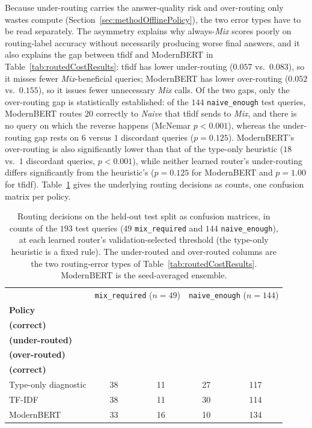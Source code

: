 \documentclass[english, bibtex]{kththesis}               %
\numberwithin{listing}{chapter}
\begin{document}
Because under-routing carries the answer-quality risk and over-routing only wastes compute (Section~\ref{sec:methodOfflinePolicy}), the two error types have to be read separately. The asymmetry explains why always-\emph{Mix} scores poorly on routing-label accuracy without necessarily producing worse final answers, and it also explains the gap between \gls{tfidf} and ModernBERT in Table~\ref{tab:routedCostResults}: \gls{tfidf} has lower under-routing ($0.057$ vs.\ $0.083$), so it misses fewer \emph{Mix}-beneficial queries; ModernBERT has lower over-routing ($0.052$ vs.\ $0.155$), so it issues fewer unnecessary \emph{Mix} calls. Of the two gaps, only the over-routing gap is statistically established: of the $144$ \texttt{naive\_enough} test queries, ModernBERT routes $20$ correctly to \emph{Naive} that \gls{tfidf} sends to \emph{Mix}, and there is no query on which the reverse happens (McNemar $p < 0.001$), whereas the under-routing gap rests on $6$ versus $1$ discordant queries ($p = 0.125$). ModernBERT's over-routing is also significantly lower than that of the type-only heuristic ($18$ vs.\ $1$ discordant queries, $p < 0.001$), while neither learned router's under-routing differs significantly from the heuristic's ($p = 0.125$ for ModernBERT and $p = 1.00$ for \gls{tfidf}). Table~\ref{tab:confusionMatrices} gives the underlying routing decisions as counts, one confusion matrix per policy.

\begin{table}[!ht]
\centering
\small
\setlength{\tabcolsep}{5pt}
\renewcommand{\arraystretch}{1.1}
\caption[Routing decisions on the held-out test split as confusion matrices]{Routing decisions on the held-out test split as confusion matrices, in counts of the $193$ test queries ($49$ \texttt{mix\_required} and $144$ \texttt{naive\_enough}), at each learned router's validation-selected threshold (the type-only heuristic is a fixed rule). The under-routed and over-routed columns are the two routing-error types of Table~\ref{tab:routedCostResults}. ModernBERT is the seed-averaged ensemble.}
\label{tab:confusionMatrices}
\begin{tabular}{l|cc|cc}
 & \multicolumn{2}{c|}{\texttt{mix\_required} ($n = 49$)} & \multicolumn{2}{c}{\texttt{naive\_enough} ($n = 144$)} \\
\textbf{Policy} & \makecell{\textbf{To \emph{Mix}}\\\textbf{(correct)}} & \makecell{\textbf{To \emph{Naive}}\\\textbf{(under-routed)}} & \makecell{\textbf{To \emph{Mix}}\\\textbf{(over-routed)}} & \makecell{\textbf{To \emph{Naive}}\\\textbf{(correct)}} \\
\hline
Type-only diagnostic & 38 & 11 & 27 & 117 \\
TF-IDF & 38 & 11 & 30 & 114 \\
ModernBERT & 33 & 16 & 10 & 134 \\
\end{tabular}
\end{table}
\end{document}
